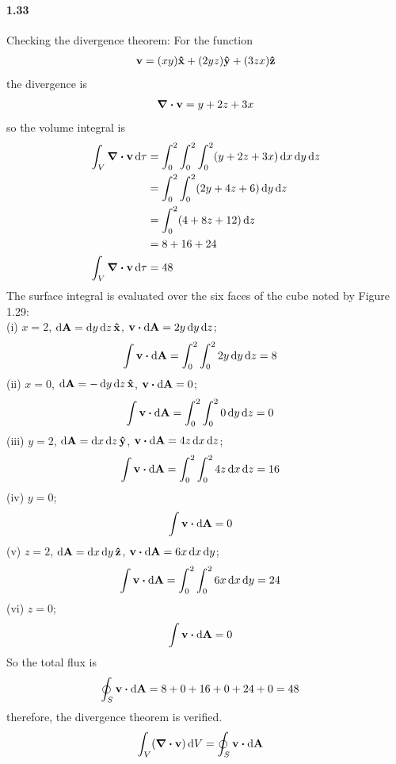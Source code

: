 \documentclass[../main.tex]{subfiles}
\begin{document}
\paragraph{1.33}
Checking the divergence theorem: For the function
\begin{align*}
    \vb{v} = (xy) \vu{x} + (2yz) \vu{y} + (3zx)\vu{z}
\end{align*}
the divergence is
\begin{align*}
    \div{\vb{v}} = y + 2z + 3x
\end{align*}
so the volume integral is
\begin{align*}
    \int_V \div{\vb{v}} \dd{\tau} &= \int_0^2 \int_0^2 \int_0^2(y + 2z + 3x) \dd{x}\dd{y}\dd{z} \\
    &= \int_0^2 \int_0^2 (2y + 4z + 6) \dd{y}\dd{z} \\
    &= \int_0^2 (4 + 8z + 12) \dd{z} \\
    &= 8 + 16 + 24 \\
    \int_V \div{\vb v} \dd{\tau} &= 48
\end{align*}
The surface integral is evaluated over the six faces of the cube noted by Figure 1.29: \\
(i) $x = 2$, $\dd{\vb{A}} = \dd{y}\dd{z} \vu{x}$, $\vb{v} \vdot \dd{\vb{A}} = 2y \dd{y}\dd{z}$;
\begin{align*}
    \int \vb{v} \vdot \dd{\vb{A}} &= \int_0^2 \int_0^2 2y \dd{y}\dd{z} = 8
\end{align*}
(ii) $x = 0$, $\dd{\vb{A}} = -\dd{y}\dd{z} \vu{x}$, $\vb{v} \vdot \dd{\vb{A}} = 0$;
\begin{align*}
    \int \vb{v} \vdot \dd{\vb{A}} &= \int_0^2 \int_0^2 0 \dd{y}\dd{z} = 0
\end{align*}
(iii) $y = 2$, $\dd{\vb{A}} = \dd{x}\dd{z} \vu{y}$, $\vb{v} \vdot \dd{\vb{A}} = 4z \dd{x}\dd{z}$;
\begin{align*}
    \int \vb{v} \vdot \dd{\vb{A}} &= \int_0^2 \int_0^2 4z \dd{x}\dd{z} = 16
\end{align*}
(iv) $y = 0$;
\begin{align*}
    \int \vb{v} \vdot \dd{\vb{A}} &= 0
\end{align*}
(v) $z = 2$, $\dd{\vb{A}} = \dd{x}\dd{y} \vu{z}$, $\vb{v} \vdot \dd{\vb{A}} = 6x \dd{x}\dd{y}$;
\begin{align*}
    \int \vb{v} \vdot \dd{\vb{A}} &= \int_0^2 \int_0^2 6x \dd{x}\dd{y} = 24
\end{align*}
(vi) $z = 0$;
\begin{align*}
    \int \vb{v} \vdot \dd{\vb{A}} &= 0
\end{align*}
So the total flux is
\begin{align*}
    \oint_S \vb{v} \vdot \dd{\vb{A}} &= 8 + 0 + 16 + 0 + 24 + 0 = 48
\end{align*}
therefore, the divergence theorem is verified.
\begin{align*}
    \int_V (\div{\vb{v}}) \dd{V} &= \oint_S \vb{v} \vdot \dd{\vb{A}}
\end{align*}
\newpage
\end{document}
